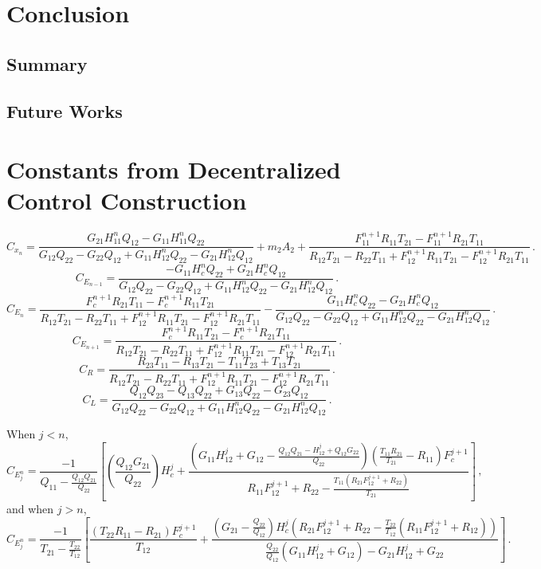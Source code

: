 \documentclass[11pt]{ucthesis}
\begin{document}
\chapter{Conclusion}
\section{Summary}
\section{Future Works}

\nocite{*}



\appendix
\chapter{Constants from Decentralized Control Construction}
\[
C_{x_n} = \frac{G_{21}H_{11}^nQ_{12}-G_{11}H_{11}^nQ_{22}}{G_{12}Q_{22}-G_{22}Q_{12}+G_{11}H_{12}^nQ_{22}-G_{21}H_{12}^nQ_{12}}+m_2A_2+\frac{F_{11}^{n+1}R_{11}T_{21}-F_{11}^{n+1}R_{21}T_{11}}{R_{12}T_{21}-R_{22}T_{11}+F_{12}^{n+1}R_{11}T_{21}-F_{12}^{n+1}R_{21}T_{11}} \,.
\]
\[
C_{E_{n-1}}= \frac{-G_{11}H_c^nQ_{22}+G_{21}H_c^nQ_{12}}{G_{12}Q_{22}-G_{22}Q_{12}+G_{11}H_{12}^nQ_{22}-G_{21}H_{12}^nQ_{12}} \,.
\]
\[
C_{E_n} = \frac{F_c^{n+1}R_{21}T_{11}-F_c^{n+1}R_{11}T_{21}}{R_{12}T_{21}-R_{22}T_{11}+F_{12}^{n+1}R_{11}T_{21}-F_{12}^{n+1}R_{21}T_{11}}-\frac{G_{11}H_c^nQ_{22}-G_{21}H_c^nQ_{12}}{G_{12}Q_{22}-G_{22}Q_{12}+G_{11}H_{12}^nQ_{22}-G_{21}H_{12}^nQ_{12}} \,.
\]
\[
C_{E_{n+1}} = \frac{F_c^{n+1}R_{11}T_{21}-F_c^{n+1}R_{21}T_{11}}{R_{12}T_{21}-R_{22}T_{11}+F_{12}^{n+1}R_{11}T_{21}-F_{12}^{n+1}R_{21}T_{11}} \,.
\]
\[
C_R = \frac{R_{23}T_{11}-R_{13}T_{21}-T_{11}T_{23}+T_{13}T_{21}}{R_{12}T_{21}-R_{22}T_{11}+F_{12}^{n+1}R_{11}T_{21}-F_{12}^{n+1}R_{21}T_{11}} \,.
\]
\[
C_L = \frac{Q_{12}Q_{23}-Q_{13}Q_{22}+G_{13}Q_{22}-G_{23}Q_{12}}{G_{12}Q_{22}-G_{22}Q_{12}+G_{11}H_{12}^nQ_{22}-G_{21}H_{12}^nQ_{12}} \,.
\]

When $j<n$,
\[
C_{E_j^n} = \frac{-1}{Q_{11}-\frac{Q_{12}Q_{21}}{Q_{22}}}\left[\left(\frac{Q_{12}G_{21}}{Q_{22}}\right)H_c^j+\frac{\left(G_{11}H_{12}^j+G_{12}-\frac{Q_{12}Q_{21}-H_{12}^j+Q_{12}G_{22}}{Q_{22}}\right)\left(\frac{T_{11}R_{21}}{T_{21}}-R_{11}\right)F_c^{j+1}}{R_{11}F_{12}^{j+1}+R_{22}-\frac{T_{11}(R_{21}F_{12}^{j+1}+R_{22})}{T_{21}}}\right] \,,
\]
and when $j>n$,
\[
C_{E_j^n} = \frac{-1}{T_{21}-\frac{T_{22}}{T_{12}}}\left[\frac{(T_{22}R_{11}-R_{21})F_c^{j+1}}{T_{12}}+\frac{\left(G_{21}-\frac{Q_{22}}{Q_{12}}\right)H_c^j\left(R_{21}F_{12}^{j+1}+R_{22}-\frac{T_{22}}{T_{12}}\left(R_{11}F_{12}^{j+1}+R_{12}\right)\right)}{\frac{Q_{22}}{Q_{12}}\left(G_{11}H_{12}^j+G_{12}\right)-G_{21}H_{12}^j+G_{22}}\right] \,.
\]
\end{document}
